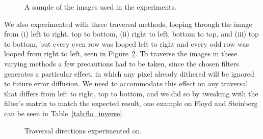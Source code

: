 \documentclass[conference]{IEEEtran}
\begin{document}
\begin{figure}[H]
{{	}
	\label{fig:peppers}
}
\quad
{}
\caption{A sample of the images used in the experiments.}
\label{fig:input}
\end{figure}

We also experimented with three traversal methods, looping through the image from (i) left to right, top to bottom, (ii) right to left, bottom to top, and (iii) top to bottom, but every even row was looped left to right and every odd row was looped from right to left, seen in Figure~\ref{fig:traversal}. To traverse the images in these varying methods a few precautions had to be taken, since the chosen filters generates a particular effect, in which any pixel already dithered will be ignored to future error diffusion. We need to accommodate this effect on any traversal that differs from left to right, top to bottom, and we did so by tweaking with the filter's matrix to match the expected result, one example on Floyd and Steinberg can be seen in Table~\ref{tab:flo_inverse}.

\begin{figure}[H]
	\centering
	\quad
	\quad
	\caption{Traversal directions experimented on.}
	\label{fig:traversal}
\end{figure}
\end{document}
